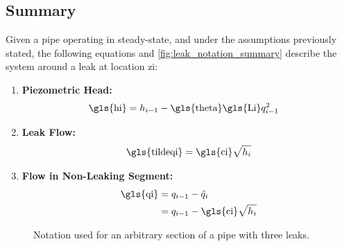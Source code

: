 \begin{samepage}
\section{Summary}
Given a pipe operating in steady-state, and under the assumptions previously stated, the following equations and \autoref{fig:leak_notation_summary} describe the system around a leak at location \gls{zi}:
\begin{enumerate}
    \item \textbf{Piezometric Head:}  
    \begin{align}
        \text{\gls{hi}} &= h_{i-1} - \text{\gls{theta}} \text{\gls{Li}} q_{i-1}^2 \label{eq:upstream_head}
    \end{align}

    \item \textbf{Leak Flow:}  
    \begin{equation}
        \text{\gls{tildeqi}} = \text{\gls{ci}}\sqrt{h_i} \label{eq:leak_flow}
    \end{equation}

    \item \textbf{Flow in Non-Leaking Segment:}  
    \begin{align}
        \text{\gls{qi}} &= q_{i-1}-\tilde{q}_{i} \notag \\
        &= q_{i-1} - \text{\gls{ci}}\sqrt{h_i} \label{eq:upstream_flow}
    \end{align}
\end{enumerate}

\begin{figure}[h!]
    \centering
    
    \caption{Notation used for an arbitrary section of a pipe with three leaks.}
    \label{fig:leak_notation_summary}
\end{figure}
\end{samepage}
